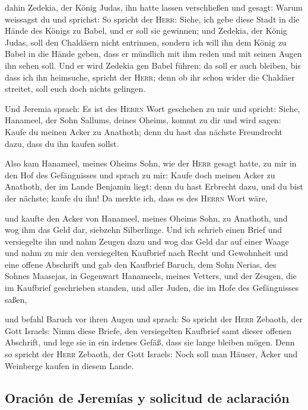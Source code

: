  dahin Zedekia, der König Judas, ihn hatte lassen
verschließen und gesagt: Warum weissagst du und sprichst: So spricht der
\textsc{Herr}: Siehe, ich gebe diese Stadt in die Hände des Königs zu
Babel, und er soll sie gewinnen;  und Zedekia, der König
Judas, soll den Chaldäern nicht entrinnen, sondern ich will ihn dem
König zu Babel in die Hände geben, dass er mündlich mit ihm reden und
mit seinen Augen ihn sehen soll.  Und er wird Zedekia gen
Babel führen; da soll er auch bleiben, bis dass ich ihn heimsuche,
spricht der \textsc{Herr}; denn ob ihr schon wider die Chaldäer
streitet, soll euch doch nichts gelingen.

 Und Jeremia sprach: Es ist des \textsc{Herrn} Wort
geschehen zu mir und spricht:  Siehe, Hanameel, der Sohn
Sallums, deines Oheims, kommt zu dir und wird sagen: Kaufe du meinen
Acker zu Anathoth; denn du hast das nächste Freundrecht dazu, dass du
ihn kaufen sollst.

 Also kam Hanameel, meines Oheims Sohn, wie der
\textsc{Herr} gesagt hatte, zu mir in den Hof des Gefängnisses und
sprach zu mir: Kaufe doch meinen Acker zu Anathoth, der im Lande
Benjamin liegt; denn du hast Erbrecht dazu, und du bist der nächste;
kaufe du ihn! Da merkte ich, dass es des \textsc{Herrn} Wort wäre,

 und kaufte den Acker von Hanameel, meines Oheims Sohn, zu
Anathoth, und wog ihm das Geld dar, siebzehn Silberlinge.
 Und ich schrieb einen Brief und versiegelte ihn und nahm
Zeugen dazu und wog das Geld dar auf einer Waage  und
nahm zu mir den versiegelten Kaufbrief nach Recht und Gewohnheit und
eine offene Abschrift  und gab den Kaufbrief Baruch, dem
Sohn Nerias, des Sohnes Maasejas, in Gegenwart Hanameels, meines
Vetters, und der Zeugen, die im Kaufbrief geschrieben standen, und aller
Juden, die im Hofe des Gefängnisses saßen,

 und befahl Baruch vor ihren Augen und sprach:
 So spricht der \textsc{Herr} Zebaoth, der Gott Israels:
Nimm diese Briefe, den versiegelten Kaufbrief samt dieser offenen
Abschrift, und lege sie in ein irdenes Gefäß, dass sie lange bleiben
mögen.  Denn so spricht der \textsc{Herr} Zebaoth, der
Gott Israels: Noch soll man Häuser, Äcker und Weinberge kaufen in diesem
Lande.

\hypertarget{oraciuxf3n-de-jeremuxedas-y-solicitud-de-aclaraciuxf3n}{%
\subsection{Oración de Jeremías y solicitud de
aclaración}\label{oraciuxf3n-de-jeremuxedas-y-solicitud-de-aclaraciuxf3n}}

